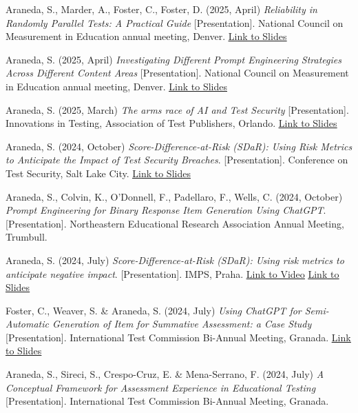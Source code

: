 \documentclass[10.5pt]{article}
\newcommand{\link}[2]{\href{#1}{\color{cvaccent}\uline{#2}}}
\newcommand{\pubentry}[2]{%
  \par\noindent\hangindent=14pt\hangafter=1\raggedright\color{cvink}#1\par\vspace{9pt}%
}
\begin{document}
\pubentry{Araneda, S., Marder, A., Foster, C., Foster, D. (2025, April) \textit{Reliability in Randomly Parallel Tests: A Practical Guide} [Presentation]. National Council on Measurement in Education annual meeting, Denver. \link{https://www.researchgate.net/publication/393062009_Reliability_in_Randomly_Parallel_Tests_A_Practical_Guide}{Link to Slides}}{ncme.png}
\pubentry{Araneda, S. (2025, April) \textit{Investigating Different Prompt Engineering Strategies Across Different Content Areas} [Presentation]. National Council on Measurement in Education annual meeting, Denver. \link{https://www.researchgate.net/publication/391737333_Investigating_Different_Prompt_Engineering_Strategies_Across_Different_Content_Areas}{Link to Slides}}{ncme.png}
\pubentry{Araneda, S. (2025, March) \textit{The arms race of AI and Test Security} [Presentation]. Innovations in Testing, Association of Test Publishers, Orlando. \link{https://www.researchgate.net/publication/393177302_The_Arms_Race_of_AI_and_Test_Security}{Link to Slides}}{atp.png}
\pubentry{Araneda, S. (2024, October) \textit{Score-Difference-at-Risk (SDaR): Using Risk Metrics to Anticipate the Impact of Test Security Breaches}. [Presentation]. Conference on Test Security, Salt Lake City. \link{https://www.researchgate.net/publication/393177336_Score-Difference-at-Risk_SDaR_Using_risk_metrics_to_anticipate_the_impact_of_test_security_breaches}{Link to Slides}}{cots_generic.jpg}
\pubentry{Araneda, S., Colvin, K., O'Donnell, F., Padellaro, F., Wells, C. (2024, October) \textit{Prompt Engineering for Binary Response Item Generation Using ChatGPT}. [Presentation]. Northeastern Educational Research Association Annual Meeting, Trumbull.}{nera.png}
\pubentry{Araneda, S. (2024, July) \textit{Score-Difference-at-Risk (SDaR): Using risk metrics to anticipate negative impact}. [Presentation]. IMPS, Praha. \link{https://www.youtube.com/watch?v=_cEUga7GG60}{Link to Video} \link{https://www.researchgate.net/publication/393061901_Score-Difference-at-Risk_SDaR_Using_risk_metrics_to_anticipate_negative_impact}{Link to Slides}}{imps.jpg}
\pubentry{Foster, C., Weaver, S. \& Araneda, S. (2024, July) \textit{Using ChatGPT for Semi-Automatic Generation of Item for Summative Assessment: a Case Study} [Presentation]. International Test Commission Bi-Annual Meeting, Granada. \link{https://www.researchgate.net/publication/393062177_Using_ChatGPT_for_Semi-Automatic_Generation_of_Item_for_Summative_Assessment_a_Case_Study_ITC_bi-annual_conference_Granada_2024}{Link to Slides}}{itc.png}
\pubentry{Araneda, S., Sireci, S., Crespo-Cruz, E. \& Mena-Serrano, F. (2024, July) \textit{A Conceptual Framework for Assessment Experience in Educational Testing} [Presentation]. International Test Commission Bi-Annual Meeting, Granada.}{itc.png}
\end{document}

